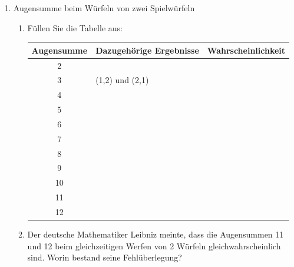 \begin{ueb}
{}{}
\begin{enumerate}
    \item Augensumme beim Würfeln von zwei Spielwürfeln
    \begin{enumerate}
        \item Füllen Sie die Tabelle aus:
            \begin{center}
                
           
            \renewcommand{\arraystretch}{2} %
            \setlength{\tabcolsep}{12pt}    %
            \begin{tabular}{|c|l|c|}
                \hline
                \textbf{Augensumme} & \textbf{Dazugehörige Ergebnisse} & \textbf{Wahrscheinlichkeit} \\
                \hline
                2  &                 &        \\
                \hline
                3  & (1,2) und (2,1) &        \\
                \hline
                4  &                 &        \\
                \hline
                5  &                 &        \\
                \hline
                6  &                 &        \\
                \hline
                7  &                 &        \\
                \hline
                8  &                 &        \\
                \hline
                9  &                 &        \\
                \hline
                10 &                 &        \\
                \hline
                11 &                 &        \\
                \hline
                12 &                 &        \\
                \hline
            \end{tabular}
        \end{center}
        
        \item 	Der deutsche Mathematiker Leibniz meinte, dass die Augensummen 11 und 12 beim gleichzeitigen Werfen von 2 Würfeln gleichwahrscheinlich sind. Worin bestand seine Fehlüberlegung?
    \end{enumerate}
    

\end{enumerate}
\end{ueb}
